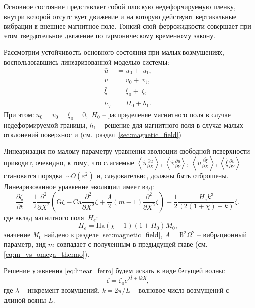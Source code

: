 \documentclass[12pt,a4paper]{article}
\begin{document}
Основное состояние представляет собой плоскую недеформируемую пленку, внутри которой отсутствует движение и на которую действуют вертикальные вибрации и внешнее магнитное поле. Тонкий слой феррожидкости совершает при этом твердотельное движение по гармоническому временному закону. 

Рассмотрим устойчивость основного состояния при малых возмущениях, воспользовавшись линеаризованной моделью системы:
\begin{align}
	\bar{u} &= u_0 + \ u_1,  \\
	\bar{v} &= v_0 + \ v_1,  \\
	\bar{\xi} &= \xi_0 + \ \zeta,   \\
	\bar{h}_y &= H_0 + h_1. 
\end{align}
При этом: $u_0 = v_0 = \xi_0 = 0,$ $H_0$ -- распределение магнитного поля в случае недеформируемой границы, $h_1$ -- решение для магнитного поля в случае малых отклонений поверхности (см.~раздел~\ref{sec:magnetic_field}). 

Линеаризация по малому параметру уравнения эволюции свободной поверхности приводит, очевидно, к тому, что слагаемые $\left< \tilde{u} \frac{\partial \tilde{u}}{\partial X} \right>$, $\left< \tilde{v} \frac{\partial \tilde{u}}{\partial Y} \right>$, $\left< \tilde{u} \frac{\partial \tilde{\xi}}{\partial X} \right>$, $\left< \tilde{\xi} \frac{\partial \tilde{v}}{\partial Y} \right>$ становятся порядка~$\sim O(\varepsilon^2)$ и, следовательно, должны быть отброшены. Линеаризованное уравнение эволюции имеет вид:
\begin{equation}\label{eq:linear_ferro}
	\frac{\partial \zeta}{\partial \bar{t}} = \frac{1}{2}
	\frac{\partial^2}{\partial X^2} \left( \mathrm{G}\zeta - \mathrm{Ca} \frac{\partial^2}{\partial X^2} \zeta + 
	\frac{A}{2} \left(m-1  \right) \frac{\partial^2}{\partial X^2} \zeta\right) + \frac{1}{2} \frac{H_e k^3}{(2 (1 + \chi)+k)} \zeta,
\end{equation}
где вклад магнитного поля~$H_{e}$:
\begin{equation*}
	H_e = \mathrm{Ha} (\chi + 1) (1+H_0) M_0 ,
	\label{eq:H_ef_ferro}
\end{equation*}
значение $M_0$ найдено в разделе \ref{sec:magnetic_field}, $A=\mathrm{B}^2 \Omega^2$ -- вибрационный параметр, вид $m$ совпадает с полученным в предыдущей главе (см. \eqref{eq:m_vs_omega_thermo}). 

Решение уравнения \eqref{eq:linear_ferro} будем искать в виде бегущей волны:
\begin{equation}\label{eq:perturbation_wave_ferro}
	\zeta = \zeta_0 e^{\lambda \bar{t} + i k X},
\end{equation}
где $\lambda$ -- инкремент возмущений, $k=2\pi/L$ -- волновое число возмущений с длиной волны $L$.
\end{document}
